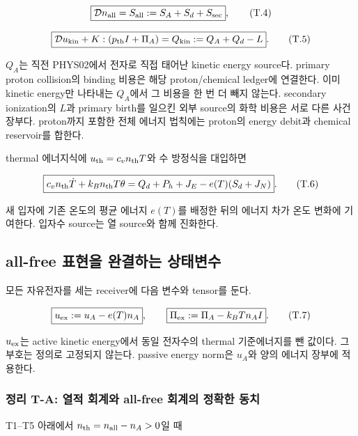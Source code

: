 \[
\boxed{\mathcal D n_{\rm all}=S_{\rm all}:=S_A+S_d+S_{\rm sec}},
\tag{T.4}
\]

\[
\boxed{\mathcal D u_{\rm kin}
+K:(p_{\rm th}I+\Pi_A)=Q_{\rm kin}:=Q_A+Q_d-L}.
\tag{T.5}
\]

\(Q_A\)는 직전 PHYS02에서 전자로 직접 태어난 kinetic energy source다. primary proton collision의 binding 비용은 해당 proton/chemical ledger에 연결한다. 이미 kinetic energy만 나타내는 \(Q_A\)에서 그 비용을 한 번 더 빼지 않는다. secondary ionization의 \(L\)과 primary birth를 일으킨 외부 source의 화학 비용은 서로 다른 사건 장부다. proton까지 포함한 전체 에너지 법칙에는 proton의 energy debit과 chemical reservoir를 합한다.

thermal 에너지식에 \(u_{\rm th}=c_vn_{\rm th}T\)와 수 방정식을 대입하면

\[
\boxed{c_vn_{\rm th}\dot T+k_Bn_{\rm th}T\theta
=Q_d+P_h+J_E-e(T)(S_d+J_N)}.
\tag{T.6}
\]

새 입자에 기존 온도의 평균 에너지 \(e(T)\)를 배정한 뒤의 에너지 차가 온도 변화에 기여한다. 입자수 source는 열 source와 함께 진화한다.

\hypertarget{all-free-uxd45cuxd604uxc744-uxc644uxacb0uxd558uxb294-uxc0c1uxd0dcuxbcc0uxc218}{%
\subsection{all-free 표현을 완결하는 상태변수}\label{all-free-uxd45cuxd604uxc744-uxc644uxacb0uxd558uxb294-uxc0c1uxd0dcuxbcc0uxc218}}

모든 자유전자를 세는 receiver에 다음 변수와 tensor를 둔다.

\[
\boxed{u_{\rm ex}:=u_A-e(T)n_A},\qquad
\boxed{\Pi_{\rm ex}:=\Pi_A-k_BTn_AI}.
\tag{T.7}
\]

\(u_{\rm ex}\)는 active kinetic energy에서 동일 전자수의 thermal 기준에너지를 뺀 값이다. 그 부호는 정의로 고정되지 않는다. passive energy norm은 \(u_A\)와 양의 에너지 장부에 적용한다.

\hypertarget{uxc815uxb9ac-t-a-uxc5f4uxc801-uxd68cuxacc4uxc640-all-free-uxd68cuxacc4uxc758-uxc815uxd655uxd55c-uxb3d9uxce58}{%
\subsubsection{정리 T-A: 열적 회계와 all-free 회계의 정확한 동치}\label{uxc815uxb9ac-t-a-uxc5f4uxc801-uxd68cuxacc4uxc640-all-free-uxd68cuxacc4uxc758-uxc815uxd655uxd55c-uxb3d9uxce58}}

T1--T5 아래에서 \(n_{\rm th}=n_{\rm all}-n_A>0\)일 때

